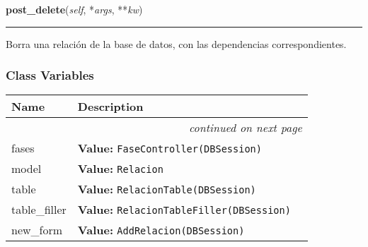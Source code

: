     \label{saip:controllers:relacion_controller:RelacionController:post_delete}

    \vspace{0.5ex}

\hspace{.8\funcindent}\begin{boxedminipage}{\funcwidth}

    \raggedright \textbf{post\_delete}(\textit{self}, *\textit{args}, **\textit{kw})

    \vspace{-1.5ex}

    \rule{\textwidth}{0.5\fboxrule}
\setlength{\parskip}{2ex}
    Borra una relación de la base de datos, con las dependencias 
    correspondientes.

\setlength{\parskip}{1ex}
    \end{boxedminipage}



  \subsubsection{Class Variables}

    \vspace{-1cm}
\hspace{\varindent}\begin{longtable}{|p{\varnamewidth}|p{\vardescrwidth}|l}
\cline{1-2}
\cline{1-2} \centering \textbf{Name} & \centering \textbf{Description}& \\
\cline{1-2}
\endhead\cline{1-2}\multicolumn{3}{r}{\small\textit{continued on next page}}\\\endfoot\cline{1-2}
\endlastfoot\raggedright f\-a\-s\-e\-s\- & \raggedright \textbf{Value:} 
{\tt FaseController(DBSession)}&\\
\cline{1-2}
\raggedright m\-o\-d\-e\-l\- & \raggedright \textbf{Value:} 
{\tt Relacion}&\\
\cline{1-2}
\raggedright t\-a\-b\-l\-e\- & \raggedright \textbf{Value:} 
{\tt RelacionTable(DBSession)}&\\
\cline{1-2}
\raggedright t\-a\-b\-l\-e\-\_\-f\-i\-l\-l\-e\-r\- & \raggedright \textbf{Value:} 
{\tt RelacionTableFiller(DBSession)}&\\
\cline{1-2}
\raggedright n\-e\-w\-\_\-f\-o\-r\-m\- & \raggedright \textbf{Value:} 
{\tt AddRelacion(DBSession)}&\\
\cline{1-2}
\end{longtable}

